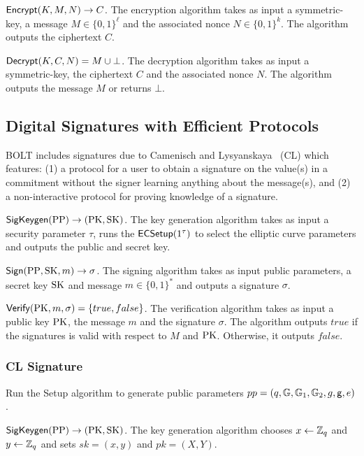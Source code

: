 \documentclass[11pt]{report}
\begin{document}
\medskip \noindent
${\sf Encrypt}(K, M, N) \rightarrow C$. The encryption algorithm takes as input a symmetric-key, a message $M \in \{0,1\}^\ell$ and the associated nonce $N \in \{0,1\}^k$. The algorithm outputs the ciphertext $C$. 

\medskip \noindent
${\sf Decrypt}(K, C, N) = M \cup \bot$. The decryption algorithm takes as input a symmetric-key, the ciphertext $C$ and the associated nonce $N$. The algorithm outputs the message $M$ or returns $\bot$.

\subsection{Digital Signatures with Efficient Protocols} %
\label{sec:signatures}

BOLT includes signatures due to Camenisch and Lysyanskaya~\cite{CL04} (CL) which features: (1) a protocol for a user to obtain a signature on the value(s) in a commitment without the signer learning anything about the message(s), and (2) a non-interactive protocol for proving knowledge of a signature.

\medskip \noindent
${\sf SigKeygen}(\mathrm{PP}) \rightarrow (\mathrm{PK}, \mathrm{SK})$. The key generation algorithm takes as input a security parameter $\tau$, runs the ${\sf ECSetup}(1^\tau)$ to select the elliptic curve parameters and outputs the public and secret key.

\medskip \noindent
${\sf Sign}(\mathrm{PP}, \mathrm{SK}, m) \rightarrow \sigma$. The signing algorithm takes as input public parameters, a secret key $\mathrm{SK}$ and message $m \in \{0,1\}^*$ and outputs a signature $\sigma$.

\medskip \noindent
${\sf Verify}(\mathrm{PK}, m, \sigma) =  \{true, false\}$. The verification algorithm takes as input a public key $\mathrm{PK}$, the message $m$ and the signature $\sigma$. The algorithm outputs $true$ if the signatures is valid with respect to $M$ and $\mathrm{PK}$. Otherwise, it outputs $false$.

\subsubsection{CL Signature~\cite{CL04}}
\label{sec:clsigs}

Run the {\sf Setup} algorithm to generate public parameters $pp = (q, \mathbb{G}, \mathbb{G}_1, \mathbb{G}_2, g, {\sf g}, e)$.

\medskip \noindent
${\sf SigKeygen}(\mathrm{PP}) \rightarrow (\mathrm{PK}, \mathrm{SK})$. The key generation algorithm chooses $x \leftarrow \mathbb{Z}_q$ and $y \leftarrow \mathbb{Z}_q$ and sets $sk = (x, y)$ and $pk = (X, Y)$.
\end{document}

